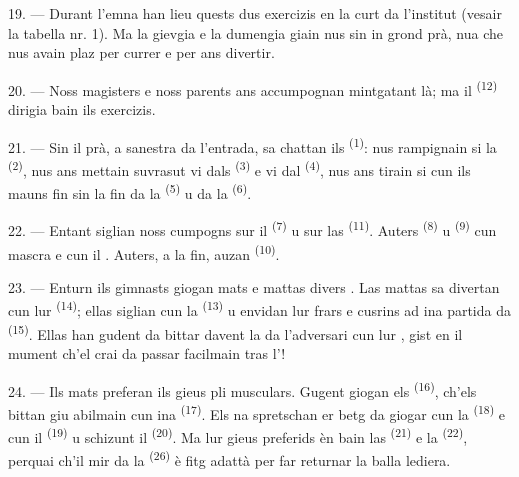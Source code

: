 19. --- Durant l'emna han lieu quests dus exercizis en la curt da l'institut
(vesair la tabella nr. 1). Ma la gievgia e la dumengia giain nus sin in grond
prà, nua che nus avain plaz per currer e per ans divertir.

20. --- Noss magisters e noss parents ans accumpognan mintgatant là; ma il
\textsuperscript{(12)} dirigia bain ils exercizis.

21. --- Sin il prà, a sanestra da l'entrada, sa chattan ils \textsuperscript{(1)}: nus rampignain si la
\textsuperscript{(2)}, nus ans mettain suvrasut vi dals
\textsuperscript{(3)} e vi dal \textsuperscript{(4)},
nus ans tirain si cun ils mauns fin sin la fin da la \textsuperscript{(5)} u da la \textsuperscript{(6)}.

22. --- Entant siglian noss cumpogns sur il \textsuperscript{(7)} u sur las \textsuperscript{(11)}.
Auters \textsuperscript{(8)} u
\textsuperscript{(9)} cun mascra e cun il .
Auters, a la fin, auzan \textsuperscript{(10)}.

\VUsaut{4.6mm}
\VUsaut{3.0mm}

23. --- Enturn ils gimnasts giogan mats e mattas divers . Las mattas
sa divertan cun lur \textsuperscript{(14)}; ellas siglian cun la
\textsuperscript{(13)} u envidan lur frars e cusrins ad ina partida
da \textsuperscript{(15)}. Ellas han gudent da bittar davent la
 da l'adversari cun lur , gist en il mument
ch'el crai da passar facilmain tras l'!

24. --- Ils mats preferan ils gieus pli musculars. Gugent giogan els
\textsuperscript{(16)}, ch'els bittan giu abilmain cun ina
\textsuperscript{(17)}. Els na spretschan er betg da giogar cun la
\textsuperscript{(18)} e cun il \textsuperscript{(19)}
u schizunt il \textsuperscript{(20)}. Ma lur gieus
preferids èn bain las \textsuperscript{(21)} e la \textsuperscript{(22)}, perquai ch'il mir da la
\textsuperscript{(26)} è fitg adattà per far returnar la balla
lediera.


